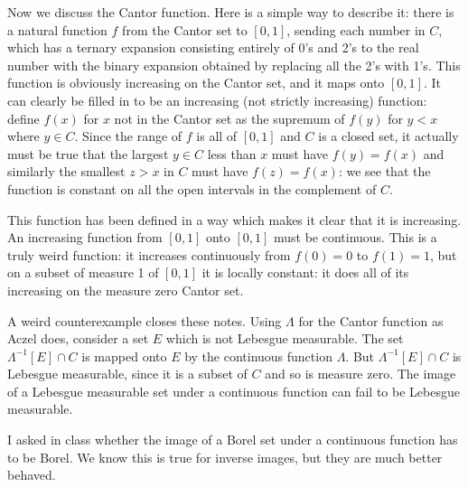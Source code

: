 \documentclass[12pt]{article}
\begin{document}
Now we discuss the Cantor function.  Here is a simple way to describe it:  there is a natural function $f$ from the Cantor set to $[0,1]$, sending each number in $C$,  which has a ternary expansion consisting entirely of 0's and 2's to the real number with the binary expansion obtained by replacing all the 2's with 1's.  This function is obviously increasing on the Cantor set, and it maps onto $[0,1]$.  It can clearly be filled in to be an increasing (not strictly increasing) function:  define $f(x)$ for $x$ not in the Cantor set as the supremum of $f(y)$ for $y<x$ where $y \in C$.  Since the range
of $f$ is all of $[0,1]$ and $C$ is a closed set, it actually must be true that the largest $y \in C$ less than $x$ must have $f(y)=f(x)$ and similarly the smallest $z>x$ in $C$ must have $f(z)=f(x)$:  we see that the function is constant on all the open intervals in the complement of $C$.

This function has been defined in a way which makes it clear that it is increasing.  An increasing function from $[0,1]$ onto $[0,1]$ must be continuous.  This is a truly weird function:  it increases
continuously from $f(0) = 0$ to $f(1)=1$, but on a subset of measure 1 of $[0,1]$ it is locally constant:  it does all of its increasing on the measure zero Cantor set.

A weird counterexample closes these notes.  Using $\Lambda$ for the Cantor function as Aczel does, consider a set $E$ which is not Lebesgue measurable.  The set $\Lambda^{-1}[E] \cap C$ is mapped onto $E$ by the continuous function $\Lambda$.  But $\Lambda^{-1}[E] \cap C$ is Lebesgue measurable, since it is a subset of $C$ and so is measure zero.  The image of a Lebesgue measurable set under a continuous function can fail to be Lebesgue measurable.

I asked in class whether the image of a Borel set under a continuous function has to be Borel.  We know this is true for inverse images, but they are much better behaved.
\end{document}
